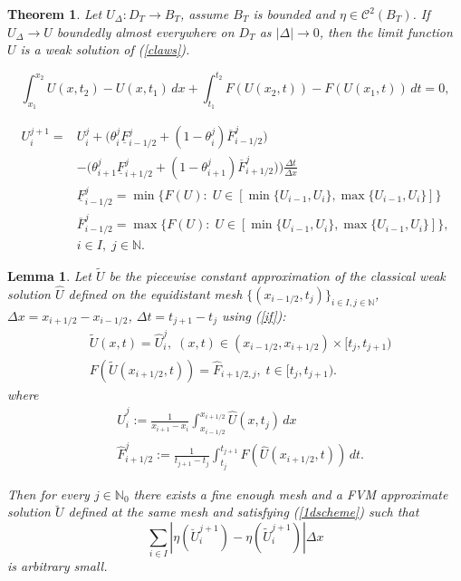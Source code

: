 \documentclass[10pt,a4paper]{amsart}
\newtheorem{theorem}{Theorem}
\newtheorem{lemma}{Lemma}
\begin{document}
\begin{theorem} \label{lw}
Let $U_{\Delta}:D_{T} \to B_{T}$, assume $B_{T}$ is bounded and 
$\eta\in \mathcal{C}^{2}(B_{T})$.
If $U_{\Delta} \to U$ boundedly almost everywhere on $D_{T}$ as $|\Delta|\to 0$, then the limit function $U$ is a weak solution of (\ref{claws}).
\end{theorem}

\begin{equation} \label{if}
\int ^{x_{2}}_{x_{1}}U( x,t_{2}) -U( x,t_{1}) \, dx+\int ^{t_{2}}_{t_{1}}
F( U( x_{2},t) ) -F( U( x_{1},t) ) \, dt=0,
\end{equation}

\begin{equation} \label{1dscheme}
\begin{split}
U_{i}^{j+1} =  & U_{i}^{j}+\Big( \theta_{i}^{j}\underline{F}_{i-1/2}^{j}
+(1-\theta_{i}^{j})\overline{F}_{i-1/2}^{j}) \\
& -\big(\theta_{i+1}^{j}\underline{F}_{i+1/2}^{j}
+(1-\theta_{i+1}^{j})\overline{F}_{i+1/2}^{j}\big) \Big) \frac{\Delta t}{\Delta x}\\
& \underline{F}_{i-1/2}^{j}=\min\{F(U):\; 
U\in [\min\{U_{i-1},U_{i}\},\max\{U_{i-1},U_{i}\}]\} \\
& \overline{F}_{i-1/2}^{j}=\max\{F(U):\; 
U\in [\min\{U_{i-1},U_{i}\},\max\{U_{i-1},U_{i}\}]\},\\ 
& i\in I,\; j\in \mathbb{N}.
\end{split}
\end{equation}

\begin{lemma} \label{lemma3.1}
Let $\widetilde{U}$ be the piecewise constant approximation of the classical weak solution
$\widehat{U}$ defined on the equidistant mesh 
$\{ (x_{i-1/2},t_{j})\}_{i\in I, j\in \mathbb{N}}$, $\Delta x=x_{i+1/2}-x_{i-1/2}$, 
$\Delta t=t_{j+1}-t_{j}$ using (\ref{if}):
\[
\begin{split}
& \widetilde{U}(x,t)=\widehat{U}_{i}^{j},\; (x,t) \in (x_{i-1/2},x_{i+1/2})\times [t_{j},t_{j+1}) \\
& F(\widetilde{U}(x_{i+1/2},t))=\widehat{F}_{i+1/2,j},\; t\in [t_{j},t_{j+1}). 
\end{split} 
\]
where 
\begin{equation}\label{kappa} 
\begin{split}
& \widehat{U}_{i}^{j}:= \frac{1}{x_{i+1}-x_{i}}\int_{x_{i-1/2}}^{x_{i+1/2}} \widehat{U}(x,t_{j}) \, dx \\
& \widehat{F}_{i+1/2}^{j}:=\frac{1}{t_{j+1}-t_{j}}\int ^{t_{j+1}}_{t_{j}}F(\widehat{U}(x_{i+1/2},t)) \, dt.
\end{split}
\end{equation}

Then for every $j\in \mathbb{N}_{0}$ 
there exists a fine enough mesh and a FVM approximate solution 
$\breve{U}$ defined at the same mesh and satisfying (\ref{1dscheme}) such that 
\begin{equation}\label{s}
\sum_{i\in I}|\eta(\breve{U}_{i}^{j+1})-\eta(\widetilde{U}_{i}^{j+1})|\Delta x
\end{equation}
is arbitrary small.
\end{lemma}
\end{document}
